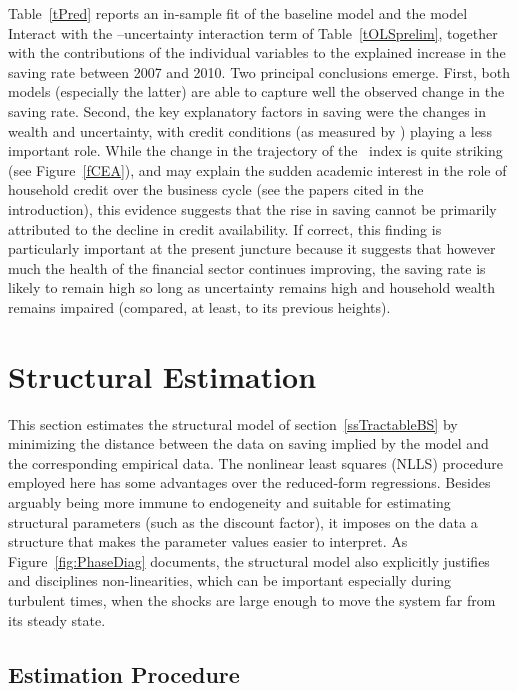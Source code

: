 \documentclass[titlepage]{\econtex}
\begin{document}
Table~\ref{tPred} reports an in-sample fit of the baseline model and
the model Interact with the \CEA--uncertainty interaction term of
Table~\ref{tOLSprelim}, together with the contributions of the individual
variables to the explained increase in the saving rate between 2007
and 2010. Two principal conclusions emerge. First, both models
(especially the latter) are able to capture well the observed change
in the saving rate. Second, the key explanatory factors in saving were the changes in wealth and uncertainty, with
credit conditions (as measured by \CEA) playing a less important role.  While the
change in the trajectory of the \CEA\ index is quite striking (see
Figure~\ref{fCEA}), and may explain the sudden academic interest in the
role of household credit over the business cycle (see the papers cited
in the introduction), this evidence suggests that the rise in saving
cannot be primarily attributed to the decline in credit availability.  If
correct, this finding is particularly important at the present
juncture because it suggests that however much the health of the
financial sector continues improving, the saving rate is likely to remain high so
long as uncertainty remains high and household wealth remains impaired
(compared, at least, to its previous heights).

\section{Structural Estimation} \label{sStructuralEstimation}

This section estimates the structural model of section~\ref{ssTractableBS} by minimizing the distance between the data on saving implied by the model and the corresponding empirical data. The nonlinear least squares (NLLS) procedure employed here has some advantages over the reduced-form regressions. Besides arguably being more immune to endogeneity and suitable for estimating structural parameters (such as the discount factor), it imposes on the data a structure that makes the parameter values easier to interpret. As Figure~\ref{fig:PhaseDiag} documents, the structural model also explicitly justifies and disciplines non-linearities, which can be important especially during turbulent times, when the shocks are large enough to move the system far from its steady state.

\subsection{Estimation Procedure}
\end{document}

